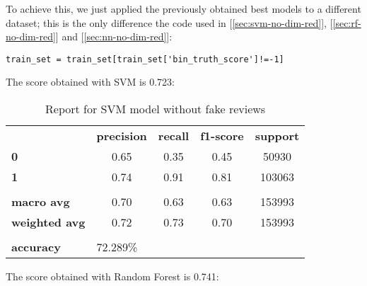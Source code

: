 To achieve this, we just applied the previously obtained best models to a different dataset; this is the only difference \wrt the code used in [\ref{sec:svm-no-dim-red}], [\ref{sec:rf-no-dim-red}] and [\ref{sec:nn-no-dim-red}]:
\begin{lstlisting}[caption={Removing fake reviews},label={lst:remove-fake-rev}]
    train_set = train_set[train_set['bin_truth_score']!=-1]
\end{lstlisting}

The score obtained with SVM is 0.723:

\begin{table}[h!]
    \centering
    \begin{tabular}{lcccc}
        \rowcolor[HTML]{EEEEEE} 
        \cellcolor[HTML]{FBFBFB} & \textbf{precision} & \textbf{recall} & \textbf{f1-score} & \textbf{support} \\
        \rowcolor[HTML]{EEEEEE} 
        \textbf{0}               & 0.65               & 0.35            & 0.45              & 50930            \\
        \rowcolor[HTML]{EEEEEE} 
        \textbf{1}               & 0.74               & 0.91            & 0.81              & 103063           \\
        \rowcolor[HTML]{FBFBFB} 
        &                    &                 &                   &                  \\
        \rowcolor[HTML]{EEEEEE} 
        \textbf{macro avg}       & 0.70               & 0.63            & 0.63              & 153993           \\
        \rowcolor[HTML]{EEEEEE} 
        \textbf{weighted avg}    & 0.72               & 0.73            & 0.70              & 153993           \\
        \rowcolor[HTML]{FBFBFB} 
        &                    &                 &                   &                  \\
        \rowcolor[HTML]{EEEEEE} 
        \textbf{accuracy}        & \multicolumn{4}{l}{\cellcolor[HTML]{EEEEEE}72.289\%}                         
    \end{tabular}
    \caption{Report for SVM model without fake reviews}
    \label{tab:svm-res-no-fake}
\end{table}

The score obtained with Random Forest is 0.741:

